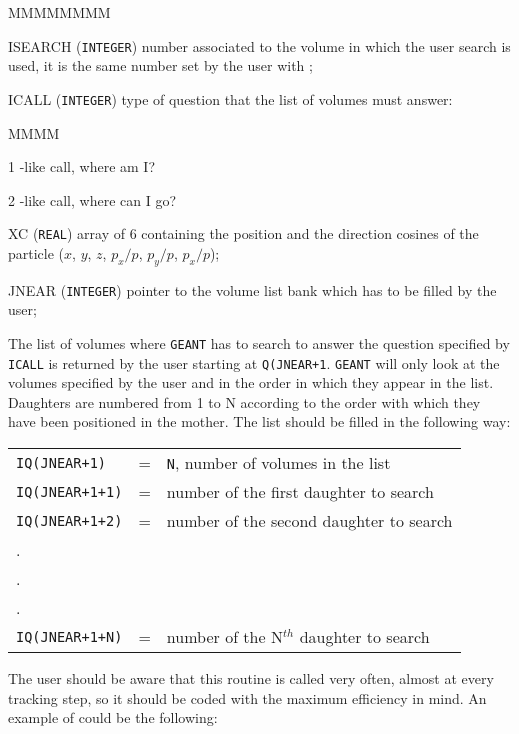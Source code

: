 \begin{DLtt}{MMMMMMMM}
\item[ISEARCH] ({\tt INTEGER}) number associated to the volume in which
the user search is used, it is the same number set by the user with
;
\item[ICALL] ({\tt INTEGER}) type of question that the list of volumes
must answer:
\begin{DLtt}{MMMM}
\item[1] -like call, where am I?
\item[2] -like call, where can I go?
\end{DLtt}
\item[XC] ({\tt REAL}) array of 6 containing the position and the
direction cosines of the particle ($x$, $y$, $z$, $p_x/p$, $p_y/p$, $p_x/p$);
\item[JNEAR] ({\tt INTEGER}) pointer to the volume list bank which has
to be filled by the user;
\end{DLtt}

The list of volumes where {\tt GEANT} has to search to answer the question
specified by {\tt ICALL} is returned by the user starting at {\tt Q(JNEAR+1}.
{\tt GEANT} will only look at the volumes specified by the user and in
the order in which they appear in the list. Daughters are numbered from 1
to N according to the order with which they have been positioned in the
mother. The list should be filled in the following way:

\begin{tabular}{lcp{7cm}}
{\tt IQ(JNEAR+1)} & = & {\tt N}, number of volumes in the list \\
{\tt IQ(JNEAR+1+1)} & = & number of the first daughter to search \\
{\tt IQ(JNEAR+1+2)} & = & number of the second daughter to search \\
.\\
.\\
.\\
{\tt IQ(JNEAR+1+N)} & = & number of the N$^{th}$ daughter to search 
\end{tabular}

The user should be aware that this routine is called very often, almost
at every tracking step, so it should be coded with the maximum efficiency
in mind.  An example of  could be the following:


